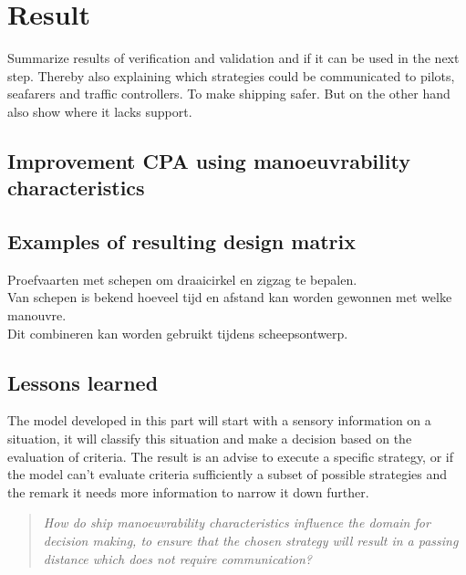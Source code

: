 \chapter{Result}
Summarize results of verification and validation and if it can be used in the next step. Thereby also explaining which strategies could be communicated to pilots, seafarers and traffic controllers. To make shipping safer. But on the other hand also show where it lacks support.

\section{Improvement CPA using manoeuvrability characteristics}

\section{Examples of resulting design matrix}
Proefvaarten met schepen om draaicirkel en zigzag te bepalen.\\
Van schepen is bekend hoeveel tijd en afstand kan worden gewonnen met welke manouvre.\\
Dit combineren kan worden gebruikt tijdens scheepsontwerp.\\

\section{Lessons learned}
The model developed in this part will start with a sensory information on a situation, it will classify this situation and make a decision based on the evaluation of criteria. The result is an advise to execute a specific strategy, or if the model can't evaluate criteria sufficiently a subset of possible strategies and the remark it needs more information to narrow it down further.

\begin{quotation}
	\emph{How do ship manoeuvrability characteristics influence the domain for decision making, to ensure that the chosen strategy will result in a passing distance which does not require communication?} 
\end{quotation}
